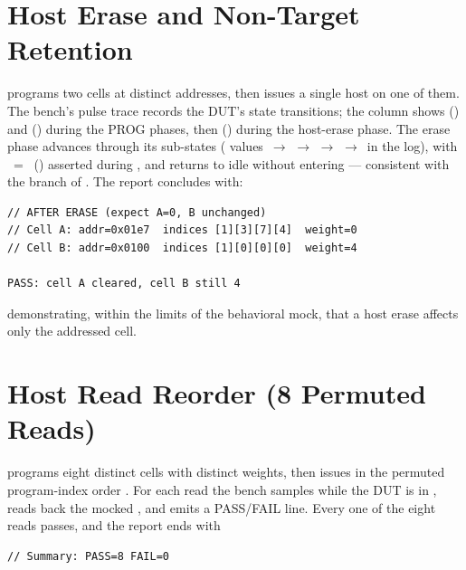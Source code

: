\section{Host Erase and Non-Target Retention}
\label{sec:results-erase}

 programs two cells at distinct
addresses, then issues a single host  on one of them.
The bench's pulse trace records the DUT's state transitions; the
 column shows  () and 
() during the PROG phases, then 
() during the host-erase phase. The erase phase
advances through its sub-states ( values
\,\(\rightarrow\)\,\,\(\rightarrow\)\,\,\(\rightarrow\)\,\,\(\rightarrow\)\,
in the log), with ~=~ ()
asserted during , and returns to idle without entering
 --- consistent with the 
branch of . The report concludes with:

\begin{lstlisting}[style=plainstyle,language={}]
// AFTER ERASE (expect A=0, B unchanged)
// Cell A: addr=0x01e7  indices [1][3][7][4]  weight=0
// Cell B: addr=0x0100  indices [1][0][0][0]  weight=4

PASS: cell A cleared, cell B still 4
\end{lstlisting}

demonstrating, within the limits of the behavioral mock, that a host
erase affects only the addressed cell.

\section{Host Read Reorder (8 Permuted Reads)}
\label{sec:results-readreorder}

 programs eight distinct
cells with distinct weights, then issues  in the
permuted program-index order . For each read the
bench samples  while the DUT is in
, reads back the mocked ,
and emits a PASS/FAIL line. Every one of the eight reads passes, and the
report ends with

\begin{lstlisting}[style=plainstyle,language={}]
// Summary: PASS=8 FAIL=0
\end{lstlisting}

